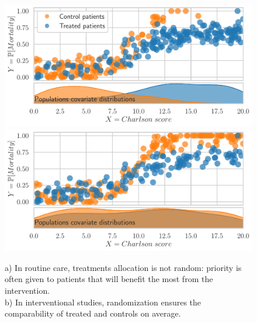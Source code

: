 \documentclass[french,12pt,twoside,a4paper]{book}
\begin{document}
\begin{figure}[h!]
  \begin{minipage}{0.32\textwidth}
    \caption{a) In routine care,
      treatments allocation is not random: priority is often given to patients
      that will benefit the most from the intervention.\\%
      b) In interventional studies,
      randomization ensures the comparability of treated and controls on average.
      \label{intro:fig:observational_vs_interventional}
    }
  \end{minipage}
  \hfill
  \begin{minipage}{0.65\textwidth}
    {\sffamily\footnotesize{}}
    \vfill%
    \includegraphics[width=1\linewidth]{img/chapter_1/sample.pdf}%
    \vfill%
    {\sffamily\footnotesize{}}
    \vfill%
    \includegraphics[width=1\linewidth]{img/chapter_1/sample_rct.pdf}%
  \end{minipage}
\end{figure}
\end{document}
